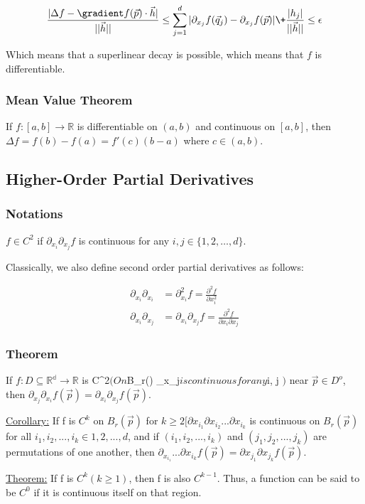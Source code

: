 \documentclass[11 pt, twoside]{article}
\begin{document}
$$\frac{|\Delta f - \gradient f(\vec{p}) \cdot \vec{h}|}{||\vec{h}||} \leq
\sum_{j=1}^d |\partial_{x_j} f(\vec{q}_j) - \partial_{x_j} f(\vec{p})| \+
\frac{|h_j|}{||\vec{h}||} \leq \epsilon$$

Which means that a superlinear decay is possible, which means that $f$ is
differentiable.

\subsubsection{Mean Value Theorem}

If $f : [a, b] \to \mathbb{R}$ is differentiable on $(a, b)$ and continuous
on $[a, b]$, then $\Delta f = f(b) - f(a) = f'(c)(b - a)$ where $c \in (a, b)$.

\subsection{Higher-Order Partial Derivatives}

\subsubsection{Notations}
$f \in C^2$ if $\partial_{x_i}\partial_{x_j} f$ is continuous for any $i, j \in
\{1, 2, \dots, d\}$.

Classically, we also define second order partial derivatives as follows:

\begin{align*}
    \partial_{x_i} \partial_{x_i} &= \partial_{x_i}^2 f = \frac{\partial^2 f}
    {\partial x_i^2}\\
    \partial_{x_i} \partial_{x_j} &= \partial_{x_i} \partial_{x_j} f =
    \frac{\partial^2 f}{\partial x_i \partial x_j}
\end{align*}

\subsubsection{Theorem}
If $f:D \subseteq \mathbb{R^d} \to \mathbb{R}$ is C^2$ (On $B_r() \partial_{x_j}$ is continuous for any $i, j $)$ near $\vec{p} \in D^o$, then $\partial_{x_j}\partial_{x_i} f(\vec{p}) = \partial_{x_i}\partial_{x_j} f(\vec{p})$.

\underline{Corollary:}
If f is $C^k$ on $B_r(\vec{p})$ for $k \geq 2 [\partial{x_{i_1}}\partial{x_{i_2}}...\partial{x_{i_k}}$ is continuous on $B_r(\vec{p})$ for all $i_1, i_2, ..., i_k \in {1, 2, ..., d}$, and if $(i_1, i_2, ..., i_k)$ and $(j_1, j_2, ..., j_k)$ are permutations of one another, then $\partial_{x_{i_1}}...\partial{x_{i_k}}f(\vec{p}) = \partial{x_{j_1}}\partial{x_{j_k}}f(\vec{p})$.

\underline{Theorem:}
If f is $C^k (k \geq 1)$, then f is also $C^{k-1}$. Thus, a function can be said to be $C^0$ if it is continuous itself on that region.
\end{document}
